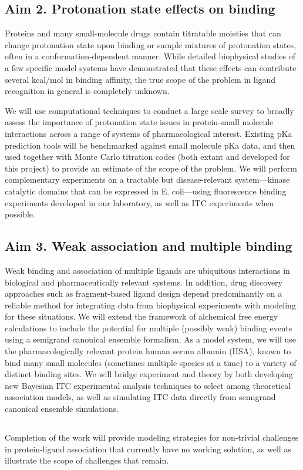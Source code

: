 \documentclass[10pt]{article}
\begin{document}
\subsection*{Aim 2. Protonation state effects on binding}
Proteins and many small-molecule drugs contain titratable moieties that can change protonation state upon binding or sample mixtures of protonation states, often in a conformation-dependent manner. 
While detailed biophysical studies of a few specific model systems have demonstrated that these effects can contribute several kcal/mol in binding affinity, the true scope of the problem in ligand recognition in general is completely unknown. 

We will use computational techniques to conduct a large scale survey to broadly assess the importance of protonation state issues in protein-small molecule interactions across a range of systems of pharmacological interest. 
Existing pKa prediction tools will be benchmarked against small molecule pKa data, and then used together with Monte Carlo titration codes (both extant and developed for this project) to provide an estimate of the scope of the problem. 
We will perform complementary experiments on a tractable but disease-relevant system---kinase catalytic domains that can be expressed in E. coli---using fluorescence binding experiments developed in our laboratory, as well as ITC experiments when possible.

\subsection*{Aim 3. Weak association and multiple binding}
Weak binding and association of multiple ligands are ubiquitous interactions in biological and pharmaceutically relevant systems.
In addition, drug discovery approaches such as fragment-based ligand design depend predominantly on a reliable method for integrating data from biophysical experiments with modeling for these situations.
We will extend the framework of alchemical free energy calculations to include the potential for multiple (possibly weak) binding events using a semigrand canonical ensemble formalism. 
As a model system, we will use the pharmacologically relevant protein human serum albumin (HSA), known to bind many small molecules (sometimes multiple species at a time) to a variety of distinct binding sites.
We will bridge experiment and theory by both developing new Bayesian ITC experimental analysis techniques to select among theoretical association models, as well as simulating ITC data directly from semigrand canonical ensemble simulations.

\subsection*{}

Completion of the work will provide modeling strategies for non-trivial challenges in protein-ligand association that currently have no working solution, as well as illustrate the scope of challenges that remain.

	
\end{document}
